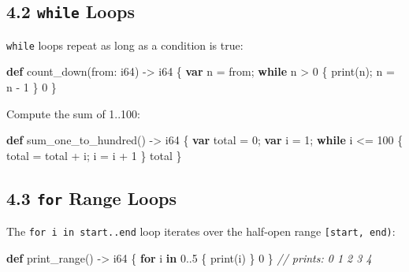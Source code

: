 \documentclass[
  english,
]{book}
\newenvironment{Shaded}{\begin{snugshade}}{\end{snugshade}}
\newcommand{\CommentTok}[1]{\textcolor[rgb]{0.42,0.60,0.33}{\textit{#1}}}
\newcommand{\ControlFlowTok}[1]{\textcolor[rgb]{0.77,0.53,0.75}{\textbf{#1}}}
\newcommand{\DataTypeTok}[1]{\textcolor[rgb]{0.31,0.79,0.69}{#1}}
\newcommand{\DecValTok}[1]{\textcolor[rgb]{0.71,0.81,0.66}{#1}}
\newcommand{\FunctionTok}[1]{\textcolor[rgb]{0.86,0.86,0.67}{#1}}
\newcommand{\KeywordTok}[1]{\textcolor[rgb]{0.34,0.61,0.84}{\textbf{#1}}}
\newcommand{\NormalTok}[1]{\textcolor[rgb]{0.83,0.83,0.83}{#1}}
\newcommand{\OperatorTok}[1]{\textcolor[rgb]{0.83,0.83,0.83}{#1}}
\begin{document}
\subsection{\texorpdfstring{4.2 \texttt{while}
Loops}{4.2 while Loops}}\label{while-loops}

\texttt{while} loops repeat as long as a condition is true:

\begin{Shaded}
\begin{Highlighting}[]
\KeywordTok{def}\NormalTok{ count\_down(from: }\DataTypeTok{i64}\NormalTok{) }\OperatorTok{{-}\textgreater{}} \DataTypeTok{i64}\NormalTok{ \{}
    \KeywordTok{var}\NormalTok{ n }\OperatorTok{=}\NormalTok{ from;}
    \ControlFlowTok{while}\NormalTok{ n }\OperatorTok{\textgreater{}} \DecValTok{0}\NormalTok{ \{}
        \FunctionTok{print}\NormalTok{(n);}
\NormalTok{        n }\OperatorTok{=}\NormalTok{ n }\OperatorTok{{-}} \DecValTok{1}
\NormalTok{    \}}
    \DecValTok{0}
\NormalTok{\}}
\end{Highlighting}
\end{Shaded}

Compute the sum of 1..100:

\begin{Shaded}
\begin{Highlighting}[]
\KeywordTok{def}\NormalTok{ sum\_one\_to\_hundred() }\OperatorTok{{-}\textgreater{}} \DataTypeTok{i64}\NormalTok{ \{}
    \KeywordTok{var}\NormalTok{ total }\OperatorTok{=} \DecValTok{0}\NormalTok{;}
    \KeywordTok{var}\NormalTok{ i }\OperatorTok{=} \DecValTok{1}\NormalTok{;}
    \ControlFlowTok{while}\NormalTok{ i }\OperatorTok{\textless{}=} \DecValTok{100}\NormalTok{ \{}
\NormalTok{        total }\OperatorTok{=}\NormalTok{ total }\OperatorTok{+}\NormalTok{ i;}
\NormalTok{        i }\OperatorTok{=}\NormalTok{ i }\OperatorTok{+} \DecValTok{1}
\NormalTok{    \}}
\NormalTok{    total}
\NormalTok{\}}
\end{Highlighting}
\end{Shaded}

\subsection{\texorpdfstring{4.3 \texttt{for} Range
Loops}{4.3 for Range Loops}}\label{for-range-loops}

The \texttt{for\ i\ in\ start..end} loop iterates over the half-open
range \texttt{{[}start,\ end)}:

\begin{Shaded}
\begin{Highlighting}[]
\KeywordTok{def}\NormalTok{ print\_range() }\OperatorTok{{-}\textgreater{}} \DataTypeTok{i64}\NormalTok{ \{}
    \ControlFlowTok{for}\NormalTok{ i }\ControlFlowTok{in} \DecValTok{0}\OperatorTok{..}\DecValTok{5}\NormalTok{ \{}
        \FunctionTok{print}\NormalTok{(i)}
\NormalTok{    \}}
    \DecValTok{0}
\NormalTok{\}}
\CommentTok{// prints: 0 1 2 3 4}
\end{Highlighting}
\end{Shaded}
\end{document}
